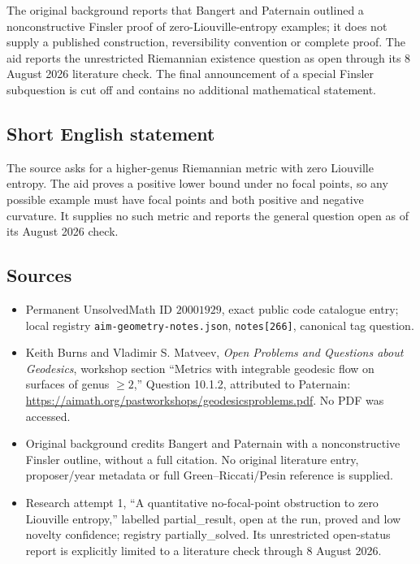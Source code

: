 \documentclass[11pt]{article}
\begin{document}
The original background reports that Bangert and Paternain outlined a nonconstructive Finsler proof of zero-Liouville-entropy examples; it does not supply a published construction, reversibility convention or complete proof. The aid reports the unrestricted Riemannian existence question as open through its 8 August 2026 literature check. The final announcement of a special Finsler subquestion is cut off and contains no additional mathematical statement.
\subsection{Short English statement}
The source asks for a higher-genus Riemannian metric with zero Liouville entropy. The aid proves a positive lower bound under no focal points, so any possible example must have focal points and both positive and negative curvature. It supplies no such metric and reports the general question open as of its August 2026 check.
\subsection{Sources}
\begin{itemize}
\item Permanent UnsolvedMath ID \(20001929\), exact public code catalogue entry; local registry \texttt{aim-geometry-notes.json}, \texttt{notes[266]}, canonical tag question.
\item Keith Burns and Vladimir S. Matveev, \emph{Open Problems and Questions about Geodesics}, workshop section ``Metrics with integrable geodesic flow on surfaces of genus \(\geq2\),'' Question 10.1.2, attributed to Paternain: \url{https://aimath.org/pastworkshops/geodesicsproblems.pdf}. No PDF was accessed.
\item Original background credits Bangert and Paternain with a nonconstructive Finsler outline, without a full citation. No original literature entry, proposer/year metadata or full Green--Riccati/Pesin reference is supplied.
\item Research attempt 1, ``A quantitative no-focal-point obstruction to zero Liouville entropy,'' labelled partial\_result, open at the run, proved and low novelty confidence; registry partially\_solved. Its unrestricted open-status report is explicitly limited to a literature check through 8 August 2026.
\end{itemize}
\end{document}
